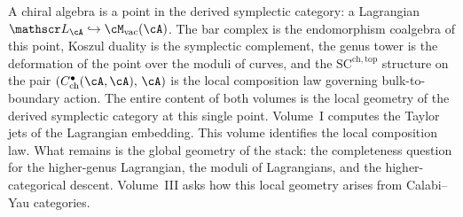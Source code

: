 A chiral algebra is a point in the derived symplectic category:
a Lagrangian $\cL_\cA \hookrightarrow \cM_{\mathrm{vac}}(\cA)$.
The bar complex is the endomorphism coalgebra of this point,
Koszul duality is the symplectic complement, the genus tower is
the deformation of the point over the moduli of curves, and the
$\mathrm{SC}^{\mathrm{ch,top}}$ structure on the pair
$(C^\bullet_{\mathrm{ch}}(\cA,\cA),\, \cA)$ is the local
composition law governing bulk-to-boundary action.
The entire content of both volumes is the local geometry of the
derived symplectic category at this single point. Volume~I
computes the Taylor jets of the Lagrangian embedding. This
volume identifies the local composition law. What remains is
the global geometry of the stack: the completeness question for
the higher-genus Lagrangian, the moduli of Lagrangians, and the
higher-categorical descent. Volume~III asks how this local
geometry arises from Calabi--Yau categories.
